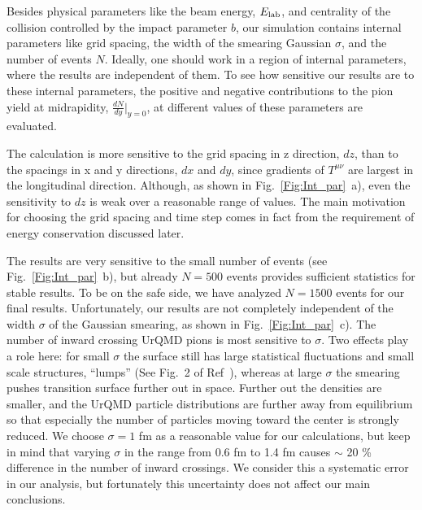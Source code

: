 Besides physical parameters like the beam energy, $E_\mathrm{lab}$, and
centrality of the collision controlled by the impact parameter $b$,
our simulation contains internal parameters like grid spacing, the
width of the smearing Gaussian $\sigma$, and the number of events $N$.
Ideally, one should work in a region of internal parameters, where the
results are independent of them. To see how sensitive our results
are to these internal parameters, the positive and negative
contributions to the pion yield at midrapidity,
$\frac{dN}{dy}|_{y=0}$, at different values of these parameters are
evaluated.

The calculation is more sensitive to the grid spacing in z direction,
$dz$, than to the spacings in x and y directions, $dx$ and $dy$, since
gradients of $T^{\mu\nu}$ are largest in the longitudinal
direction. Although, as shown in Fig.~\ref{Fig:Int_par}~a), even the
sensitivity to $dz$ is weak over a reasonable range of values. The
main motivation for choosing the grid spacing and time step comes in
fact from the requirement of energy conservation discussed later.

The results are very sensitive to the small number of events (see
Fig.~\ref{Fig:Int_par}~b), but already $N = 500$ events provides
sufficient statistics for stable results.  To be on the safe side, we
have analyzed $N=1500$ events for our final results. Unfortunately,
our results are not completely independent of the width $\sigma$ of
the Gaussian smearing, as shown in Fig.~\ref{Fig:Int_par}~c). The
number of inward crossing UrQMD pions is most sensitive to
$\sigma$. Two effects play a role here: for small $\sigma$ the surface
still has large statistical fluctuations and small scale structures,
``lumps'' (See Fig.~2 of Ref~\cite{Huovinen:2002im}), whereas at large
$\sigma$ the smearing pushes transition surface further out in
space. Further out the densities are smaller, and the UrQMD particle
distributions are further away from equilibrium so that especially the
number of particles moving toward the center is strongly reduced.  We
choose $\sigma = 1$ fm as a reasonable value for our calculations, but
keep in mind that varying $\sigma$ in the range from 0.6 fm to 1.4 fm
causes $\sim$ 20 \% difference in the number of inward crossings. We
consider this a systematic error in our analysis, but fortunately this
uncertainty does not affect our main conclusions.

